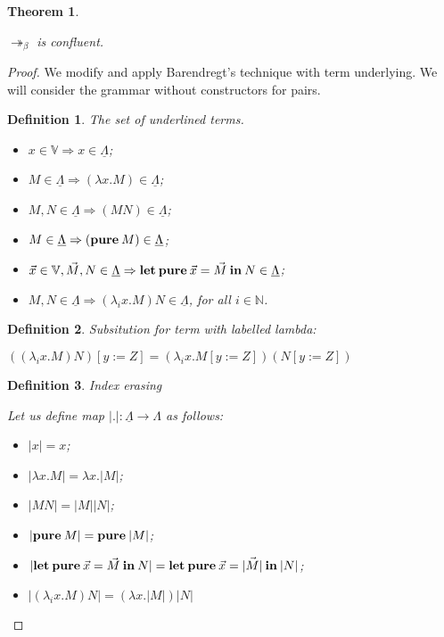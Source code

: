 \documentclass[a4paper]{article}
\newtheorem{theorem}{Theorem}
\newtheorem{defin}{Definition}
\begin{document}
\begin{theorem}
  $ $

  $\twoheadrightarrow_{\beta}$ is confluent.
\end{theorem}

\begin{proof}

  We modify and apply Barendregt's technique with term underlying. We will consider the grammar without constructors for pairs.

\begin{defin} The set of underlined terms.

  \begin{itemize}
    \item $x \in \mathbb{V} \Rightarrow x \in \underline{\Lambda}$;
    \item $M \in \underline{\Lambda} \Rightarrow (\lambda x. M) \in \underline{\Lambda}$;
    \item $M, N \in \underline{\Lambda} \Rightarrow (M N) \in \underline{\Lambda}$;
    \item $M \in \underline{\Lambda} \Rightarrow ({\bf pure \:} M) \in \underline{\Lambda}$;
    \item $\vec{x} \in \mathbb{V}, \vec{M}, N \in \underline{\Lambda} \Rightarrow {\bf let \: pure \:} \vec{x} = \vec{M} {\: \bf in \:} N \in \underline{\Lambda}$;
    \item $M, N \in \underline{\Lambda} \Rightarrow (\lambda_i x. M) N \in \underline{\Lambda}$, for all $i \in \mathbb{N}$.
  \end{itemize}
\end{defin}

\begin{defin} Subsitution for term with labelled lambda:

  $((\lambda_i x. M) N) [y := Z] = (\lambda_i x. M [y := Z]) (N [y := Z])$
\end{defin}

\begin{defin} Index erasing

  Let us define map $|.| : \underline{\Lambda} \to \Lambda$ as follows:

  \begin{itemize}
    \item $|x| = x$;
    \item $|\lambda x. M| = \lambda x. |M|$;
    \item $|M N| = |M| |N|$;
    \item $|{\bf pure \:} M| = {\bf pure \:} |M|$;
    \item $|{\bf let \: pure \:} \vec{x} = \vec{M} {\: \bf in \:} N| = {\bf let \: pure \:} \vec{x} = \vec{|M|} {\: \bf in \:} |N|$;
    \item $|(\lambda_i x. M) N| = (\lambda x. |M|) |N|$
  \end{itemize}
\end{defin}


\end{proof}
\end{document}
